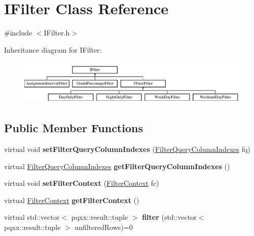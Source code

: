 \hypertarget{classIFilter}{}\section{I\+Filter Class Reference}
\label{classIFilter}


{\ttfamily \#include $<$I\+Filter.\+h$>$}

Inheritance diagram for I\+Filter\+:\begin{figure}[H]
\begin{center}
\leavevmode
\includegraphics[height=2.167742cm]{classIFilter}
\end{center}
\end{figure}
\subsection*{Public Member Functions}
\begin{DoxyCompactItemize}
\item 
\mbox{\label{classIFilter_ad66e2b3f6268436f2b7b127dab38633d}} 
virtual void {\bfseries set\+Filter\+Query\+Column\+Indexes} (\hyperlink{structFilterQueryColumnIndexes}{Filter\+Query\+Column\+Indexes} fq)
\item 
\mbox{\label{classIFilter_aab274a76ddbba2591c9112edf4bfbc26}} 
virtual \hyperlink{structFilterQueryColumnIndexes}{Filter\+Query\+Column\+Indexes} {\bfseries get\+Filter\+Query\+Column\+Indexes} ()
\item 
\mbox{\label{classIFilter_a1ab08052b3949763ea2f0dd04a05030b}} 
virtual void {\bfseries set\+Filter\+Context} (\hyperlink{structFilterContext}{Filter\+Context} fc)
\item 
\mbox{\label{classIFilter_a5e3249740f7f913a03d09f4437d98be4}} 
virtual \hyperlink{structFilterContext}{Filter\+Context} {\bfseries get\+Filter\+Context} ()
\item 
\mbox{\label{classIFilter_a3abe23670a8b3641fae336cf5efdb775}} 
virtual std\+::vector$<$ pqxx\+::result\+::tuple $>$ {\bfseries filter} (std\+::vector$<$ pqxx\+::result\+::tuple $>$ unfiltered\+Rows)=0
\end{DoxyCompactItemize}


